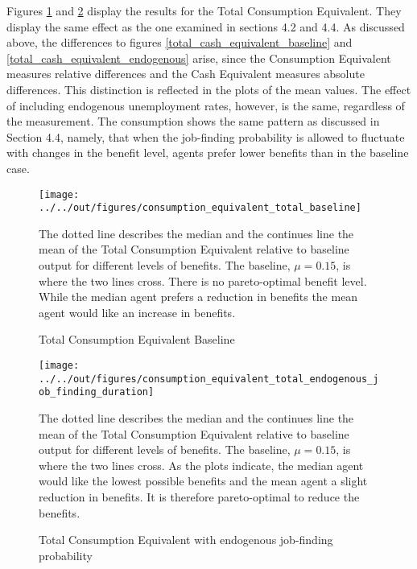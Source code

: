 \documentclass[a4paper,11pt]{article}
\begin{document}
Figures \ref{consumption_equivalent_baseline} and \ref{total_consumption_equivalent} display the results for the Total Consumption Equivalent. They display the same effect as the one examined in sections 4.2 and 4.4. As discussed above, the differences to figures \ref{total_cash_equivalent_baseline} and \ref{total_cash_equivalent_endogenous} arise, since the Consumption Equivalent measures relative differences and the Cash Equivalent measures absolute differences. This  distinction is reflected in the plots of the mean values. The effect of including endogenous unemployment rates, however, is the same, regardless of the measurement. The consumption shows the same pattern as discussed in Section 4.4, namely, that when the job-finding probability is allowed to fluctuate with changes in the benefit level, agents prefer lower benefits than in the baseline case. 

\begin{figure}[!htbp]
\caption{Total Consumption Equivalent Baseline} 
\label{consumption_equivalent_baseline}	%
\centering
\texttt{[image: ../../out/figures/consumption\_equivalent\_total\_baseline]}

\begin{minipage}{0.8\linewidth}
\footnotesize{The dotted line describes the median and the continues line the mean of the Total Consumption Equivalent relative to baseline output for different levels of benefits. The baseline, $\mu = 0.15$, is where the two lines cross. There is no pareto-optimal benefit level. While the median agent prefers a reduction in benefits the mean agent would like an increase in benefits.}
\end{minipage}

\end{figure}


\begin{figure}[!htbp]
\caption{Total Consumption Equivalent with endogenous job-finding probability} 
\label{total_consumption_equivalent}	%
\centering
\texttt{[image: ../../out/figures/consumption\_equivalent\_total\_endogenous\_job\_finding\_duration]} %

\begin{minipage}{0.8\linewidth}
\footnotesize{The dotted line describes the median and the continues line the mean of the Total Consumption Equivalent relative to baseline output for different levels of benefits. The baseline, $\mu = 0.15$, is where the two lines cross. As the plots indicate, the median agent would like the lowest possible benefits and the mean agent a slight reduction in benefits. It is therefore pareto-optimal to reduce the benefits.}
\end{minipage}

\end{figure}
\pagebreak
\end{document}

